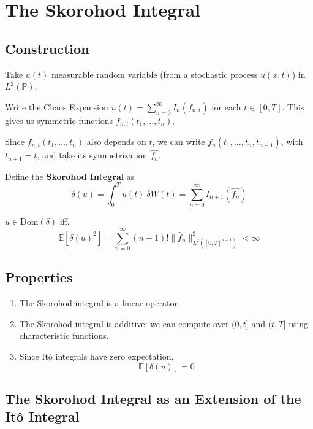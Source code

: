\chapter{The Skorohod Integral}

\section{Construction}

Take $u(t)$ measurable random variable (from a stochastic process $u(x,t)$) in $L^2(\mathbb{P})$.

Write the Chaos Expansion $u(t) = \sum_{n=0}^\infty I_{n}(f_{n,t})$ for each $t \in [0,T]$. This gives us symmetric functions $f_{n,t}(t_1, \ldots, t_n)$.

Since $f_{n,t}(t_1, \ldots, t_n)$ also depends on $t$, we can write $f_n(t_1, \ldots, t_n, t_{n+1})$, with $t_{n+1} = t$, and take its symmetrization $\hat{f_n}$.

Define the \textbf{Skorohod Integral} as
$$
\delta(u) = \int_0^T u(t)~\delta W(t) = \sum_{n=0}^\infty I_{n+1}(\hat{f_n})
$$

\begin{remark}\label{rmk:202309060706}
$u \in \text{Dom}(\delta)$ iff. 
$$
\mathbb{E}[\delta(u)^2] = \sum_{n=0}^\infty (n+1)! \| \hat{f}_n \|_{L^2([0,T]^{n+1})}^2 < \infty
$$
\end{remark}

\section{Properties}

\begin{enumerate}
\item The Skorohod integral is a linear operator.
\item The Skorohod integral is additive: we can compute over $(0,t]$ and $(t, T]$ using characteristic functions.
\item Since Itô integrals have zero expectation, $$ \mathbb{E}[\delta(u)] = 0 $$
\end{enumerate}

\section{The Skorohod Integral as an Extension of the Itô Integral}

